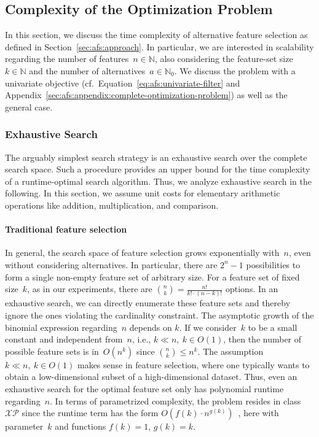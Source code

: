 \documentclass{article}
\theoremstyle{definition}
\begin{document}
\subsection{Complexity of the Optimization Problem}
\label{sec:afs:appendix:complexity}

In this section, we discuss the time complexity of alternative feature selection as defined in Section~\ref{sec:afs:approach}.
In particular, we are interested in scalability regarding the number of features~$n \in \mathbb{N}$, also considering the feature-set size~$k \in \mathbb{N}$ and the number of alternatives~$a \in \mathbb{N}_0$.
We discuss the problem with a univariate objective (cf.~Equation~\ref{eq:afs:univariate-filter} and Appendix~\ref{sec:afs:appendix:complete-optimization-problem}) as well as the general case.

\subsubsection{Exhaustive Search}
\label{sec:afs:appendix:complexity:exhaustive}

The arguably simplest search strategy is an exhaustive search over the complete search space.
Such a procedure provides an upper bound for the time complexity of a runtime-optimal search algorithm.
Thus, we analyze exhaustive search in the following.
In this section, we assume unit costs for elementary arithmetic operations like addition, multiplication, and comparison.

\paragraph{Traditional feature selection}

In general, the search space of feature selection grows exponentially with~$n$, even without considering alternatives.
In particular, there are $2^n - 1$ possibilities to form a single non-empty feature set of arbitrary size.
For a feature set of fixed size~$k$, as in our experiments, there are $\binom{n}{k} = \frac{n!}{k! \cdot (n-k)!}$ options.
In an exhaustive search, we can directly enumerate these feature sets and thereby ignore the ones violating the cardinality constraint.
The asymptotic growth of the binomial expression regarding~$n$ depends on $k$.
If we consider~$k$ to be a small constant and independent from~$n$, i.e., $k \ll n,~k \in O(1)$, then the number of possible feature sets is in~$O(n^k)$ since $\binom{n}{k} \leq n^k$.
The assumption $k \ll n,~k \in O(1)$ makes sense in feature selection, where one typically wants to obtain a low-dimensional subset of a high-dimensional dataset.
Thus, even an exhaustive search for the optimal feature set only has polynomial runtime regarding~$n$.
In terms of parametrized complexity, the problem resides in class~$\mathcal{XP}$ since the runtime term has the form $O(f(k) \cdot n^{g(k)})$~\cite{downey1997parameterized}, here with parameter~$k$ and functions $f(k) = 1$, $g(k) = k$.
\end{document}
